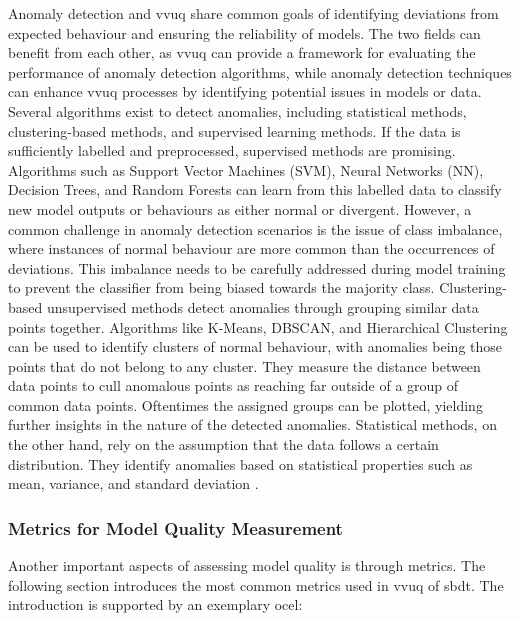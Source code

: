 Anomaly detection and \gls{vvuq} share common goals of identifying deviations from expected behaviour and ensuring the reliability of models. The two fields can benefit from each other, as \gls{vvuq} can provide a framework for evaluating the performance of anomaly detection algorithms, while anomaly detection techniques can enhance \gls{vvuq} processes by identifying potential issues in models or data.
Several algorithms exist to detect anomalies, including statistical methods, clustering-based methods, and supervised learning methods. If the data is sufficiently labelled and preprocessed, supervised methods are promising. Algorithms such as Support Vector Machines (SVM), Neural Networks (NN), Decision Trees, and Random Forests can learn from this labelled data to classify new model outputs or behaviours as either normal or divergent. However, a common challenge in anomaly detection scenarios is the issue of class imbalance, where instances of normal behaviour are more common than the occurrences of deviations. This imbalance needs to be carefully addressed during model training to prevent the classifier from being biased towards the majority class. Clustering-based unsupervised methods detect anomalies through grouping similar data points together. Algorithms like K-Means, DBSCAN, and Hierarchical Clustering can be used to identify clusters of normal behaviour, with anomalies being those points that do not belong to any cluster. They measure the distance between data points to cull anomalous points as reaching far outside of a group of common data points. Oftentimes the assigned groups can be plotted, yielding further insights in the nature of the detected anomalies. Statistical methods, on the other hand, rely on the assumption that the data follows a certain distribution. They identify anomalies based on statistical properties such as mean, variance, and standard deviation \autocite{chandola2009anomaly}.

\subsubsection*{Metrics for Model Quality Measurement}
\label{sec:metrics-theory}
Another important aspects of assessing model quality is through metrics. The following section introduces the most common metrics used in \gls{vvuq} of \gls{sbdt}. The introduction is supported by an exemplary \gls{ocel}:


